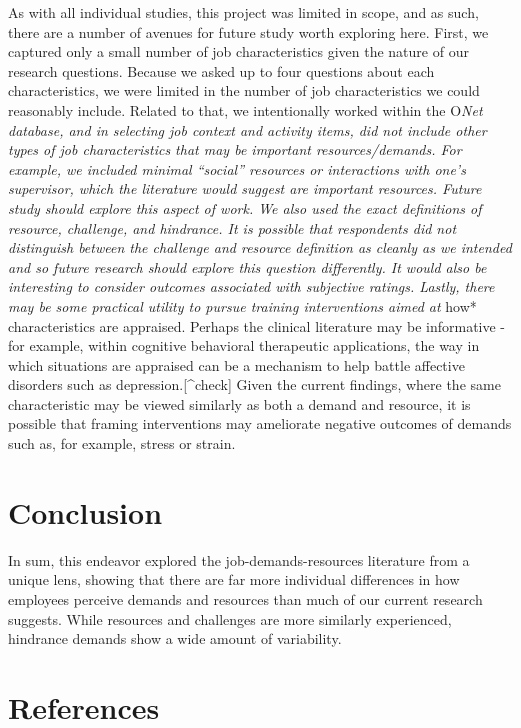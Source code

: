 \documentclass[
  english,
  man]{apa6}
\begin{document}
As with all individual studies, this project was limited in scope, and as such, there are a number of avenues for future study worth exploring here. First, we captured only a small number of job characteristics given the nature of our research questions. Because we asked up to four questions about each characteristics, we were limited in the number of job characteristics we could reasonably include. Related to that, we intentionally worked within the O\emph{Net database, and in selecting job context and activity items, did not include other types of job characteristics that may be important resources/demands. For example, we included minimal ``social'' resources or interactions with one's supervisor, which the literature would suggest are important resources. Future study should explore this aspect of work. We also used the exact definitions of resource, challenge, and hindrance. It is possible that respondents did not distinguish between the challenge and resource definition as cleanly as we intended and so future research should explore this question differently. It would also be interesting to consider outcomes associated with subjective ratings.
Lastly, there may be some practical utility to pursue training interventions aimed at }how* characteristics are appraised. Perhaps the clinical literature may be informative - for example, within cognitive behavioral therapeutic applications, the way in which situations are appraised can be a mechanism to help battle affective disorders such as depression.{[}\^{}check{]} Given the current findings, where the same characteristic may be viewed similarly as both a demand and resource, it is possible that framing interventions may ameliorate negative outcomes of demands such as, for example, stress or strain.

\hypertarget{conclusion}{%
\section{Conclusion}\label{conclusion}}

In sum, this endeavor explored the job-demands-resources literature from a unique lens, showing that there are far more individual differences in how employees perceive demands and resources than much of our current research suggests. While resources and challenges are more similarly experienced, hindrance demands show a wide amount of variability.

\newpage

\hypertarget{references}{%
\section{References}\label{references}}
\end{document}
